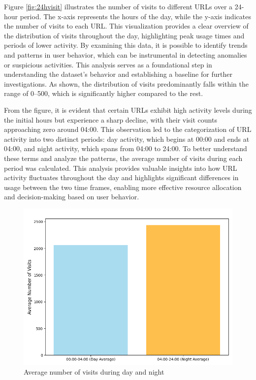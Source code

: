 Figure \ref{fig:24hvisit} illustrates the number of visits to different URLs over a 24-hour period. The x-axis represents the hours of the day, while the y-axis indicates the number of visits to each URL. This visualization provides a clear overview of the distribution of visits throughout the day, highlighting peak usage times and periods of lower activity. By examining this data, it is possible to identify trends and patterns in user behavior, which can be instrumental in detecting anomalies or suspicious activities. This analysis serves as a foundational step in understanding the dataset's behavior and establishing a baseline for further investigations.
As shown, the distribution of visits predominantly falls within the range of 0–500, which is significantly higher compared to the rest.

From the figure, it is evident that certain URLs exhibit high activity levels during the initial hours but experience a sharp decline, with their visit counts approaching zero around 04:00. This observation led to the categorization of URL activity into two distinct periods: day activity, which begins at 00:00 and ends at 04:00, and night activity, which spans from 04:00 to 24:00. To better understand these terms and analyze the patterns, the average number of visits during each period was calculated. This analysis provides valuable insights into how URL activity fluctuates throughout the day and highlights significant differences in usage between the two time frames, enabling more effective resource allocation and decision-making based on user behavior.

\begin{figure}
    \centering
    \includegraphics[width=\textwidth]{../Thesis_Docs/media/avg_day_night.png}
    \caption{Average number of visits during day and night}
    \label{fig:avg}
\end{figure}

